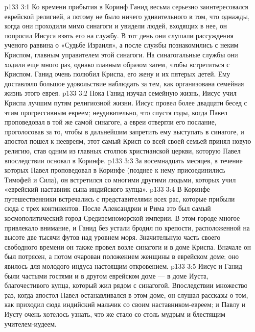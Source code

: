 \vs p133 3:1 Ко времени прибытия в Коринф Ганид весьма серьезно заинтересовался еврейской религией, а потому не было ничего удивительного в том, что однажды, когда они проходили мимо синагоги и увидели людей, входящих в нее, он попросил Иисуса взять его на службу. В тот день они слушали рассуждения ученого раввина о «Судьбе Израиля», а после службы познакомились с неким Криспом, главным управителем этой синагоги. На синагогальные службы они ходили еще много раз, однако главным образом затем, чтобы встретиться с Криспом. Ганид очень полюбил Криспа, его жену и их пятерых детей. Ему доставляло большое удовольствие наблюдать за тем, как организована семейная жизнь этого еврея.
\vs p133 3:2 Пока Ганид изучал семейную жизнь, Иисус учил Криспа лучшим путям религиозной жизни. Иисус провел более двадцати бесед с этим прогрессивным евреем; неудивительно, что спустя годы, когда Павел проповедовал в той же самой синагоге, а евреи отвергли его послание, проголосовав за то, чтобы в дальнейшим запретить ему выступать в синагоге, и апостол пошел к неевреям, этот самый Крисп со всей своей семьей принял новую религию, став одним из главных столпов христианской церкви, которую Павел впоследствии основал в Коринфе.
\vs p133 3:3 За восемнадцать месяцев, в течение которых Павел проповедовал в Коринфе (позднее к нему присоединились Тимофей и Сила), он встретился со многими другими людьми, которых учил «еврейский наставник сына индийского купца».
\vs p133 3:4 В Коринфе путешественники встречались с представителями всех рас, которые прибыли сюда с трех континентов. После Александрии и Рима это был самый космополитический город Средиземноморской империи. В этом городе многое привлекало внимание, и Ганид без устали бродил по крепости, расположенной на высоте две тысячи футов над уровнем моря. Значительную часть своего свободного времени он также провел возле синагоги и в доме Криспа. Вначале он был потрясен, а потом очарован положением женщины в еврейском доме; оно явилось для молодого индуса настоящим откровением.
\vs p133 3:5 Иисус и Ганид были частыми гостями и в другом еврейском доме --- в доме Иуста, благочестивого купца, который жил рядом с синагогой. Впоследствии множество раз, когда апостол Павел останавливался в этом доме, он слушал рассказы о том, как приходил сюда индийский мальчик со своим наставником\hyp{}евреем; и Павлу и Иусту очень хотелось узнать, что же стало со столь мудрым и блестящим учителем\hyp{}иудеем.
